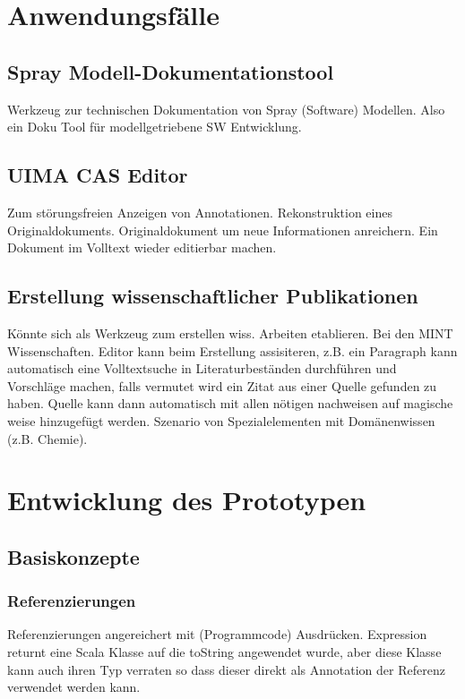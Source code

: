 \chapter{Anwendungsfälle}

\section{Spray Modell-Dokumentationstool}

Werkzeug zur technischen Dokumentation von Spray (Software) Modellen.
Also ein Doku Tool für modellgetriebene SW Entwicklung.

\section{UIMA CAS Editor}

Zum störungsfreien Anzeigen von Annotationen.
Rekonstruktion eines Originaldokuments.
Originaldokument um neue Informationen anreichern.
Ein Dokument im Volltext wieder editierbar machen.

\section{Erstellung wissenschaftlicher Publikationen}

Könnte sich als Werkzeug zum erstellen wiss. Arbeiten etablieren.
Bei den MINT Wissenschaften.
Editor kann beim Erstellung assisiteren, z.B. ein Paragraph kann automatisch
eine Volltextsuche in Literaturbeständen durchführen und Vorschläge machen,
falls vermutet wird ein Zitat aus einer Quelle gefunden zu haben.
Quelle kann dann automatisch mit allen nötigen nachweisen auf magische weise
hinzugefügt werden.
Szenario von Spezialelementen mit Domänenwissen (z.B. Chemie).


\chapter{Entwicklung des Prototypen}


\section{Basiskonzepte}

\subsection{Referenzierungen}

Referenzierungen angereichert mit (Programmcode) Ausdrücken.
Expression returnt eine Scala Klasse auf die toString angewendet wurde,
aber diese Klasse kann auch ihren Typ verraten so dass dieser direkt
als Annotation der Referenz verwendet werden kann.

